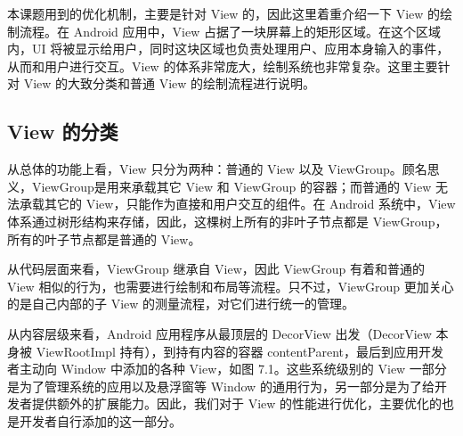 本课题用到的优化机制，主要是针对 View 的，因此这里着重介绍一下 View 的绘制流程。在 Android 应用中，View 占据了一块屏幕上的矩形区域。在这个区域内，UI 将被显示给用户，同时这块区域也负责处理用户、应用本身输入的事件，从而和用户进行交互。View 的体系非常庞大，绘制系统也非常复杂。这里主要针对 View 的大致分类和普通 View 的绘制流程进行说明。

\subsection{View 的分类}

从总体的功能上看，View 只分为两种：普通的 View 以及 ViewGroup。顾名思义，ViewGroup是用来承载其它 View 和 ViewGroup 的容器；而普通的 View 无法承载其它的 View，只能作为直接和用户交互的组件。在 Android 系统中，View 体系通过树形结构来存储，因此，这棵树上所有的非叶子节点都是 ViewGroup，所有的叶子节点都是普通的 View。

从代码层面来看，ViewGroup 继承自 View，因此 ViewGroup 有着和普通的 View 相似的行为，也需要进行绘制和布局等流程。只不过，ViewGroup 更加关心的是自己内部的子 View 的测量流程，对它们进行统一的管理。\

从内容层级来看，Android 应用程序从最顶层的 DecorView 出发（DecorView 本身被 ViewRootImpl 持有），到持有内容的容器 contentParent，最后到应用开发者主动向 Window 中添加的各种 View，如图 7.1。这些系统级别的 View 一部分是为了管理系统的应用以及悬浮窗等 Window 的通用行为，另一部分是为了给开发者提供额外的扩展能力。因此，我们对于 View 的性能进行优化，主要优化的也是开发者自行添加的这一部分。


